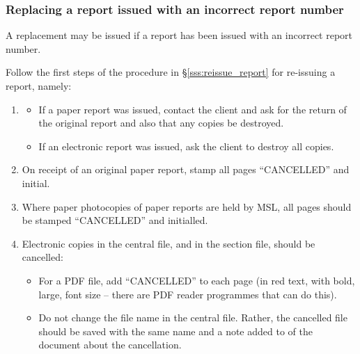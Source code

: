 \subsubsection{Replacing a report issued with an incorrect report number}

A replacement may be issued if a report has been issued with an incorrect report number. 

Follow the first steps of the procedure in \S\ref{sss:reissue_report} for re-issuing a report, namely:

\begin{enumerate}
\item 
\begin{itemize} 
\item If a paper report was issued, contact the client and ask for the return of the original report and also that any copies be destroyed. 

\item If an electronic report was issued, ask the client to destroy all copies.
\end{itemize}

\item On receipt of an original paper report, stamp all pages ``{\color{red}CANCELLED}” and initial.

\item Where paper photocopies of paper reports are held by MSL, all pages should be stamped ``{\color{red}CANCELLED}” and initialled.

\item Electronic copies in the central file, and in the section file, should be cancelled:
\begin{itemize}
\item For a PDF file, add “{\color{red}CANCELLED}” to each page (in red text, with bold, large, font size – there are PDF reader programmes that can do this). 
\item Do not change the file name in the central file. Rather, the cancelled file should be saved with the same name and a note added to  of the document about the cancellation. 
\end{itemize}
\end{enumerate}

